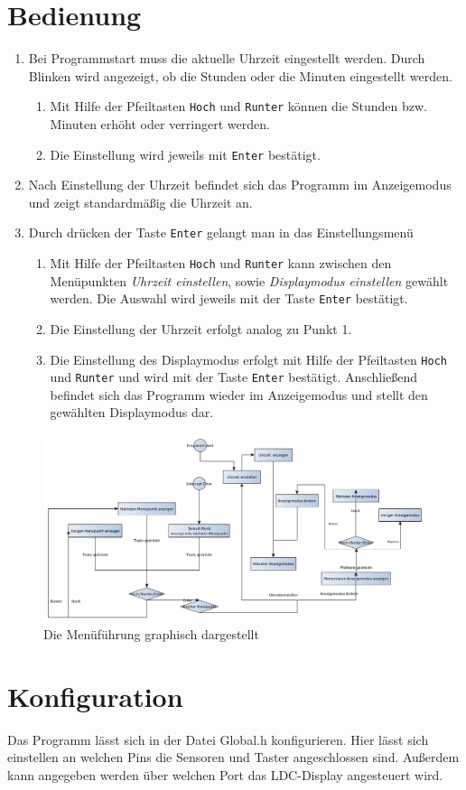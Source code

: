 \documentclass[10pt]{article}
\begin{document}
\section{Bedienung}
\begin{enumerate}
\item Bei Programmstart muss die aktuelle Uhrzeit eingestellt werden. Durch Blinken wird angezeigt, ob die Stunden oder die Minuten eingestellt werden.
	\begin{enumerate}
	\item Mit Hilfe der Pfeiltasten \texttt{Hoch} und \texttt{Runter} können die Stunden bzw. Minuten erhöht oder verringert werden.
	\item Die Einstellung wird jeweils mit \texttt{Enter} bestätigt.
	\end{enumerate}
\item Nach Einstellung der Uhrzeit befindet sich das Programm im Anzeigemodus und zeigt standardmäßig die Uhrzeit an.
\item Durch drücken der Taste \texttt{Enter} gelangt man in das Einstellungsmenü
	\begin{enumerate}
	\item Mit Hilfe der Pfeiltasten \texttt{Hoch} und \texttt{Runter} kann zwischen den Menüpunkten \textit{Uhrzeit einstellen}, sowie \textit{Displaymodus einstellen} gewählt werden. Die Auswahl wird jeweils mit der Taste \texttt{Enter} bestätigt.
	\item Die Einstellung der Uhrzeit erfolgt analog zu Punkt 1.
	\item Die Einstellung des Displaymodus erfolgt mit Hilfe der Pfeiltasten \texttt{Hoch} und \texttt{Runter} und wird mit der Taste \texttt{Enter} bestätigt. Anschließend befindet sich das Programm wieder im Anzeigemodus und stellt den gewählten Displaymodus dar.
	\end{enumerate}
\end{enumerate}
\begin{figure}[h]
\centering
\includegraphics[width=\textwidth]{img/Programmablauf.png}
\caption{Die Menüführung graphisch dargestellt}
\end{figure}
\section{Konfiguration}
Das Programm lässt sich in der Datei Global.h konfigurieren. Hier lässt sich einstellen an welchen Pins die Sensoren und Taster angeschlossen sind. Außerdem kann angegeben werden über welchen Port das LDC-Display angesteuert wird.
\end{document}
